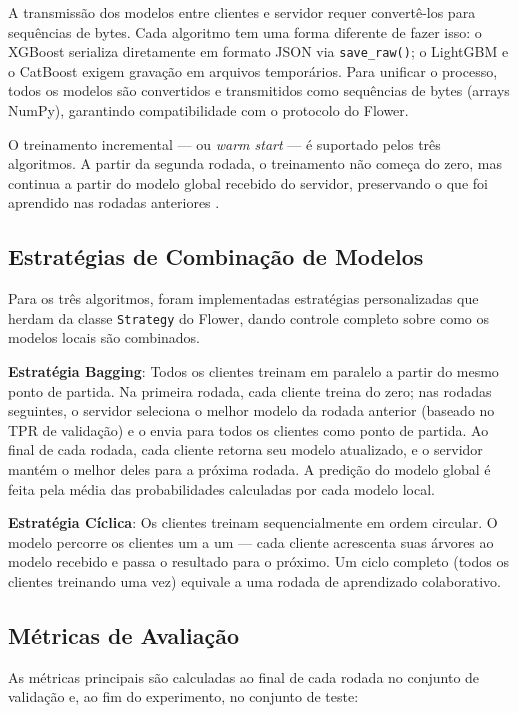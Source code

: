 A transmissão dos modelos entre clientes e servidor requer convertê-los para sequências de bytes. Cada algoritmo tem uma forma diferente de fazer isso: o XGBoost serializa diretamente em formato JSON via \texttt{save\_raw()}; o LightGBM e o CatBoost exigem gravação em arquivos temporários. Para unificar o processo, todos os modelos são convertidos e transmitidos como sequências de bytes (arrays NumPy), garantindo compatibilidade com o protocolo do Flower.

O treinamento incremental --- ou \textit{warm start} --- é suportado pelos três algoritmos. A partir da segunda rodada, o treinamento não começa do zero, mas continua a partir do modelo global recebido do servidor, preservando o que foi aprendido nas rodadas anteriores \cite{konecny2016communication}.

\subsection{Estratégias de Combinação de Modelos}

Para os três algoritmos, foram implementadas estratégias personalizadas que herdam da classe \texttt{Strategy} do Flower, dando controle completo sobre como os modelos locais são combinados.

\textbf{Estratégia Bagging}: Todos os clientes treinam em paralelo a partir do mesmo ponto de partida. Na primeira rodada, cada cliente treina do zero; nas rodadas seguintes, o servidor seleciona o melhor modelo da rodada anterior (baseado no TPR de validação) e o envia para todos os clientes como ponto de partida. Ao final de cada rodada, cada cliente retorna seu modelo atualizado, e o servidor mantém o melhor deles para a próxima rodada. A predição do modelo global é feita pela média das probabilidades calculadas por cada modelo local.

\textbf{Estratégia Cíclica}: Os clientes treinam sequencialmente em ordem circular. O modelo percorre os clientes um a um --- cada cliente acrescenta suas árvores ao modelo recebido e passa o resultado para o próximo. Um ciclo completo (todos os clientes treinando uma vez) equivale a uma rodada de aprendizado colaborativo.

\subsection{Métricas de Avaliação}

As métricas principais são calculadas ao final de cada rodada no conjunto de validação e, ao fim do experimento, no conjunto de teste:

